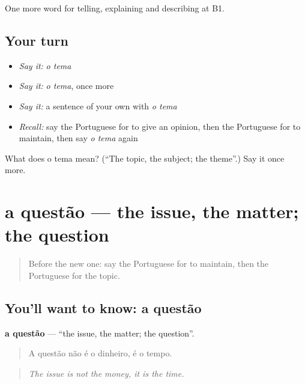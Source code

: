 \begin{grammarlens}[title={What you've built}]
One more word for telling, explaining and describing at B1.
\end{grammarlens}

\subsection*{Your turn}
\begin{itemize}
\raggedright
  \item \emph{Say it:} \emph{o tema}
  \item \emph{Say it:} \emph{o tema}, once more
  \item \emph{Say it:} a sentence of your own with \emph{o tema}
  \item \emph{Recall:} say the Portuguese for to give an opinion, then the Portuguese for to maintain, then say \emph{o tema} again
\end{itemize}

\begin{tcolorbox}[breakable,colback=teal!4,colframe=teal!35!black,title={Before you move on}]
What does o tema mean? (\textquotedblleft{}The topic, the subject; the theme\textquotedblright{}.) Say it once more.
\end{tcolorbox}
\section[a questão]{a questão — the issue, the matter; the question}

\label{lesson:PT-C336-questao}



\begin{quote}
Before the new one: say the Portuguese for to maintain, then the Portuguese for the topic.
\end{quote}

\subsection*{You'll want to know: a questão}
\textbf{a questão} — \textquotedblleft{}the issue, the matter; the question\textquotedblright{}.

\begin{quote}
A questão não é o dinheiro, é o tempo.
\end{quote}

\begin{quote}
\emph{The issue is not the money, it is the time.}
\end{quote}

